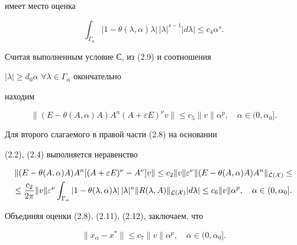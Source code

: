 имеет место оценка 


\begin{equation} 


\int_{\Gamma_\alpha} 


|1-\theta(\lambda,\alpha)\lambda|\,|\lambda|^{s-1} 


|d\lambda|\le c_4 \alpha^s. 


\end{equation} 


 


Считая выполненным условие С, из (2.9) и соотношения 


$|\lambda|\ge d_0\alpha$ $\forall\lambda\in\Gamma_\alpha$ окончательно 


находим 


\begin{equation} 


\|(E-\theta(A,\alpha)A)A^n(A+\varepsilon E)^\nu v\|\le 


c_5\|v\|\alpha^p,\quad \alpha\in(0,\alpha_0]. 


\end{equation} 


Для второго слагаемого в правой части (2.8) на основании 


(2.2), (2.4) выполняется неравенство 


\begin{multline} 


\|(E-\theta(A,\alpha)A)A^n[(A+\varepsilon E)^\nu 


-A^\nu]v\|\le c_2\|v\|\varepsilon^\nu\|(E- 


\theta(A,\alpha)A)A^n\|_{\cal L(X)} \le \\ 


% 


\le \frac{c_2}{2\pi}\|v\|\varepsilon^\nu 


\int_{\Gamma_\alpha}|1-\theta(\lambda,\alpha)\lambda| 


\,|\lambda|^n\|R(\lambda,A)\|_{\cal L(X)}|d\lambda|\le 


c_6\|v\|\alpha^p,\quad \alpha\in(0,\alpha_0]. 


\end{multline} 


Объединяя оценки (2.8), (2.11), (2.12), заключаем, что 


\begin{equation} 


\|x_\alpha-x^*\|\le c_7\|v\|\alpha^p,\quad 


\alpha\in(0,\alpha_0]. 


\end{equation} 



